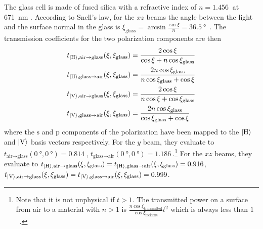 The glass cell is made of fused silica with a refractive index of $n = \SI{1.456}{}$ at \SI{671}{\nano\meter} \cite{malitson_interspecimen_1965}. According to Snell's law, for the $xz$ beams the angle between the light and the surface normal in the glass is $\xi_\text{glass} = \arcsin \frac{\sin \xi}{n} = \SI{36.5}{\degree}$~\cite{demtroder_elektromagnetische_2013}. The transmission coefficients for the two polarization components are then~\cite{demtroder_elektromagnetische_2013}
\begin{align}\label{eq:fresnel}
    \begin{split}
        t_{\Ket{\text{H}}, \text{air} \rightarrow \text{glass}}(\xi, \xi_\text{glass})  &= \frac{2 \cos \xi}{\cos \xi + n \cos \xi_\text{glass}}\\
        t_{\Ket{\text{H}}, \text{glass} \rightarrow \text{air}}(\xi, \xi_\text{glass})  &= \frac{2n \cos \xi_\text{glass}}{n \cos \xi_\text{glass} + \cos \xi} \\
        t_{\Ket{\text{V}}, \text{air} \rightarrow \text{glass}}(\xi, \xi_\text{glass})  &= \frac{2 \cos \xi}{n \cos \xi + \cos \xi_\text{glass}}\\ 
        t_{\Ket{\text{V}}, \text{glass} \rightarrow \text{air}}(\xi, \xi_\text{glass})  &= \frac{2 n \cos \xi_\text{glass}}{\cos \xi_\text{glass} + \cos \xi}\\ 
    \end{split}
\end{align}
where the $\text{s}$ and $\text{p}$ components of the polarization have been mapped to the $\Ket{\text{H}}$ and $\Ket{\text{V}}$ basis vectors respectively. For the $y$ beam, they evaluate to $t_{\text{air} \rightarrow \text{glass}}(\SI{0}{\degree}, \SI{0}{\degree}) = \SI{0.814}{}$, $t_{\text{glass} \rightarrow \text{air}}(\SI{0}{\degree}, \SI{0}{\degree}) = \SI{1.186}{}$.\footnote{Note that it is not unphysical if $t > 1$. The transmitted power on a surface from air to a material with $n > 1$ is $\frac{n \cos \xi_\text{transmitted}}{\cos \xi_\text{incident}}t^2$ which is always less than $1$~\cite{demtroder_elektromagnetische_2013}.} For the $xz$ beams, they evaluate to $t_{\Ket{\text{H}}, \text{air} \rightarrow \text{glass}}(\xi, \xi_\text{glass}) = t_{\Ket{\text{H}}, \text{glass} \rightarrow \text{air}}(\xi, \xi_\text{glass}) = \SI{0.916}{}$, $t_{\Ket{\text{V}}, \text{air} \rightarrow \text{glass}}(\xi, \xi_\text{glass}) = t_{\Ket{\text{V}}, \text{glass} \rightarrow \text{air}}(\xi, \xi_\text{glass}) = \SI{0.999}{}$.

